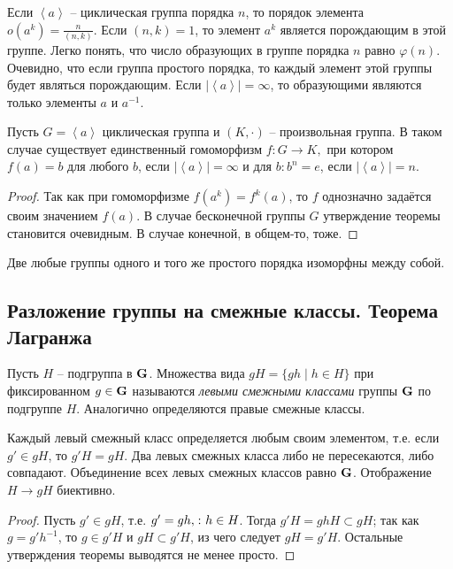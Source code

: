 Если $\left\langle a\right\rangle$ -- циклическая группа порядка $n$, то порядок элемента $o(a^k)=\frac{n}{(n,k)}$. Если $(n,k)=1$, то элемент $a^k$ является порождающим в этой группе. Легко понять, что число образующих в группе порядка $n$ равно $\varphi(n)$. Очевидно, что если группа простого порядка, то каждый элемент этой группы будет являться порождающим. Если $|\left\langle a\right\rangle|=\infty$, то образующими являются только элементы $a$ и $a^{-1}$.

\begin{theorem}
  Пусть $G=\left\langle a \right\rangle$ циклическая группа и $(K, \cdot)$ -- произвольная группа. В таком случае существует единственный гомоморфизм $f\colon G\to K,$ при котором $f(a)=b$ для любого $b$, если $|\left\langle a\right\rangle|=\infty$ и для $b\colon b^n=e$, если $|\left\langle a\right\rangle|=n$.
\end{theorem}
\begin{proof}
  Так как при гомоморфизме $f(a^k)=f^k(a)$, то $f$ однозначно задаётся своим значением $f(a)$. В случае бесконечной группы $G$ утверждение теоремы становится очевидным. В случае конечной, в общем-то, тоже.
\end{proof}

\begin{theorem}
  Две любые группы одного и того же простого порядка изоморфны между собой.
\end{theorem}

\subsection{Разложение группы на смежные классы. Теорема Лагранжа}

\begin{df}
  Пусть $H$ -- подгруппа в $\mathbf{G}$. Множества вида $gH = \{gh\mid h\in H\}$ при фиксированном $g\in\mathbf{G}$ называются \emph{левыми смежными классами} группы $\mathbf{G}$ по подгруппе $H$. Аналогично определяются правые смежные классы.
\end{df}

\begin{theorem}
  Каждый левый смежный класс определяется любым своим элементом, т.е. если $g'\in gH$, то $g'H=gH$. Два левых смежных класса либо не пересекаются, либо совпадают. Объединение всех левых смежных классов равно $\mathbf{G}$. Отображение $H\to gH$ биективно.
\end{theorem}
\begin{proof}
  Пусть $g'\in gH$, т.е. $g'=gh,\colon h\in H$. Тогда $g'H=ghH\subset gH$; так как $g=g'h^{-1}$, то $g\in g'H$ и $gH\subset g'H$, из чего следует $gH=g'H$. Остальные утверждения теоремы выводятся не менее просто.
\end{proof}

